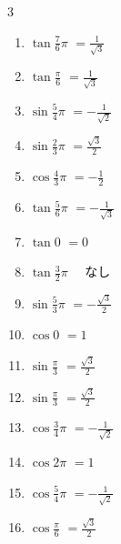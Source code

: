 \begin{multicols}{3}
\begin{enumerate}
\columnbreak %

\resetques

  \item $\displaystyle \tan{\frac{7}{6}\pi}$
        $\displaystyle =\frac{1}{\sqrt{3}}$

  \item $\displaystyle \tan{\frac{\pi}{6}}$
        $\displaystyle =\frac{1}{\sqrt{3}}$

  \item $\displaystyle \sin{\frac{5}{4}\pi}$
        $\displaystyle =-\frac{1}{\sqrt{2}}$

  \item $\displaystyle \sin{\frac{2}{3}\pi}$
        $\displaystyle =\frac{\sqrt{3}}{2}$

  \item $\displaystyle \cos{\frac{4}{3}\pi}$
        $\displaystyle =-\frac{1}{2}$

  \item $\displaystyle \tan{\frac{5}{6}\pi}$
        $\displaystyle =-\frac{1}{\sqrt{3}}$

  \item $\displaystyle \tan{0}$
        $\displaystyle =0$

  \item $\displaystyle \tan{\frac{3}{2}\pi}$
        $\displaystyle \quad なし$

  \item $\displaystyle \sin{\frac{5}{3}\pi}$
        $\displaystyle =-\frac{\sqrt{3}}{2}$

  \item $\displaystyle \cos{0}$
        $\displaystyle =1$

  \item $\displaystyle \sin{\frac{\pi}{3}}$
        $\displaystyle =\frac{\sqrt{3}}{2}$

  \item $\displaystyle \sin{\frac{\pi}{3}}$
        $\displaystyle =\frac{\sqrt{3}}{2}$

  \item $\displaystyle \cos{\frac{3}{4}\pi}$
        $\displaystyle =-\frac{1}{\sqrt{2}}$

  \item $\displaystyle \cos{2\pi}$
        $\displaystyle =1$

  \item $\displaystyle \cos{\frac{5}{4}\pi}$
        $\displaystyle =-\frac{1}{\sqrt{2}}$

  \item $\displaystyle \cos{\frac{\pi}{6}}$
        $\displaystyle =\frac{\sqrt{3}}{2}$


\end{enumerate}
\end{multicols}
